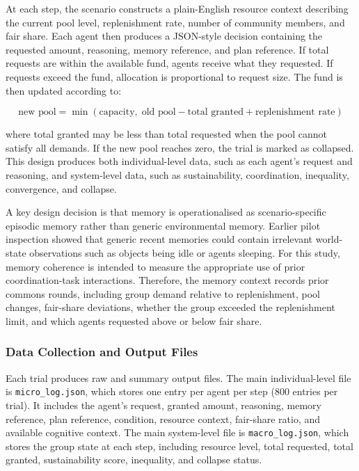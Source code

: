 \documentclass[11pt]{article}
\begin{document}
At each step, the scenario constructs a plain-English resource context describing the current pool level, replenishment rate, number of community members, and fair share. Each agent then produces a JSON-style decision containing the requested amount, reasoning, memory reference, and plan reference. If total requests are within the available fund, agents receive what they requested. If requests exceed the fund, allocation is proportional to request size. The fund is then updated according to:

\[
\text{new pool} = \min(\text{capacity},\; \text{old pool} - \text{total granted} + \text{replenishment rate})
\]

where total granted may be less than total requested when the pool cannot satisfy all demands. If the new pool reaches zero, the trial is marked as collapsed. This design produces both individual-level data, such as each agent's request and reasoning, and system-level data, such as sustainability, coordination, inequality, convergence, and collapse.

A key design decision is that memory is operationalised as scenario-specific episodic memory rather than generic environmental memory. Earlier pilot inspection showed that generic recent memories could contain irrelevant world-state observations such as objects being idle or agents sleeping. For this study, memory coherence is intended to measure the appropriate use of prior coordination-task interactions. Therefore, the memory context records prior commons rounds, including group demand relative to replenishment, pool changes, fair-share deviations, whether the group exceeded the replenishment limit, and which agents requested above or below fair share.

\subsubsection{Data Collection and Output Files}
Each trial produces raw and summary output files. The main individual-level file is \texttt{micro\_log.json}, which stores one entry per agent per step (800 entries per trial). It includes the agent's request, granted amount, reasoning, memory reference, plan reference, condition, resource context, fair-share ratio, and available cognitive context. The main system-level file is \texttt{macro\_log.json}, which stores the group state at each step, including resource level, total requested, total granted, sustainability score, inequality, and collapse status.
\end{document}
